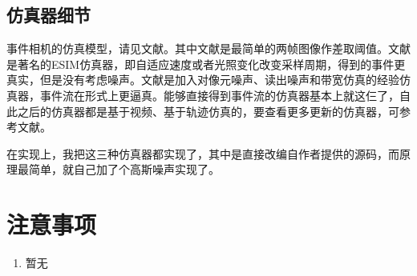 \documentclass{article}
\begin{document}
\subsection{仿真器细节}
事件相机的仿真模型，请见文献\cite{kaiserFrameworkEndtoendControl2016,rebecq_esim_2018,joubert_event_2021}。其中文献\cite{kaiserFrameworkEndtoendControl2016}是最简单的两帧图像作差取阈值。文献\cite{rebecq_esim_2018}是著名的ESIM仿真器，即自适应速度或者光照变化改变采样周期，得到的事件更真实，但是没有考虑噪声。文献\cite{joubert_event_2021}是加入对像元噪声、读出噪声和带宽仿真的经验仿真器，事件流在形式上更逼真。能够直接得到事件流的仿真器基本上就这仨了，自此之后的仿真器都是基于视频、基于轨迹仿真的，要查看更多更新的仿真器，可参考文献\cite{chakravarthiRecentEventCamera2024}。\par
在实现上，我把这三种仿真器都实现了，其中\cite{rebecq_esim_2018,joubert_event_2021}是直接改编自作者提供的源码，而\cite{kaiserFrameworkEndtoendControl2016}原理最简单，就自己加了个高斯噪声实现了。
\section{注意事项}
\begin{enumerate}
  \item 暂无
\end{enumerate}
\newpage
\printbibliography[heading=bibliography,title=参考文献]
\end{document}
